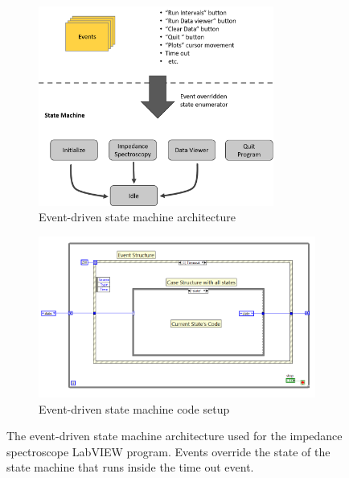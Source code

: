 \begin{figure}[h]
    \centering
    \begin{subfigure}[b]{\textwidth}
        \centering
        \includegraphics[width=0.85\textwidth]{images/program_overview.png}
        \caption{Event-driven state machine architecture}
        \label{fig:IS_architecture}
    \end{subfigure}
    \vspace{0.1 in}
    \vfill
    \begin{subfigure}[b]{\textwidth}
        \centering
        \includegraphics[width=\textwidth]{images/event_driven_SM.png}
        \caption{Event-driven state machine code setup}
        \label{fig:IS-base_code}
    \end{subfigure}
    \caption[Event-driven state machine architecture]{The event-driven state machine architecture used for the impedance spectroscope LabVIEW program. Events override the state of the state machine that runs inside the time out event.}
    \label{fig:IS_software_design}
\end{figure}
\FloatBarrier

